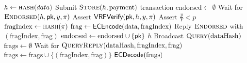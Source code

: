 \begin{algorithm}
\caption{Client operations.}
\label{alg:client}
\begin{algorithmic}[1]
    \State $h \gets \textsc{hash}(data)$
    \State Submit $\textsc{Store}(h, \text{payment})$ transaction
    \State $\text{endorsed} \gets \emptyset$
        \State Wait for $\textsc{Endorsed}(h, \textsf{pk}, y, \pi)$
        \State Assert $\textsf{VRFVerify}(\textsf{pk}, h, y, \pi)$
        \State Assert $\frac{y}{Y}<p$
        \State $\text{fragIndex} \gets \textsc{hash}(\pi)$
        \State $\text{frag} \gets \textsf{ECEncode}(\text{data}, \text{fragIndex})$
        \State Reply $\textsc{Endorsed}$ with $(\text{fragIndex}, \text{frag})$
        \State $\text{endorsed} \gets \text{endorsed} \cup \{\textsf{pk}\}$
    \EndWhile
    \State \Return $h$
\EndProcedure
{}
    \State Broadcast $\textsc{Query}(\text{dataHash})$
    \State $\text{frags} \gets \emptyset$
        \State Wait for $\textsc{QueryReply}(\text{dataHash}, \text{fragIndex}, \text{frag})$
            \State $\text{frags} \gets \text{frags} \cup \{(\text{fragIndex}, \text{frag})\}$
        \EndIf
    \EndWhile
    \State \Return $\textsf{ECDecode}(\text{frags})$
\EndProcedure
\end{algorithmic}
\end{algorithm}

